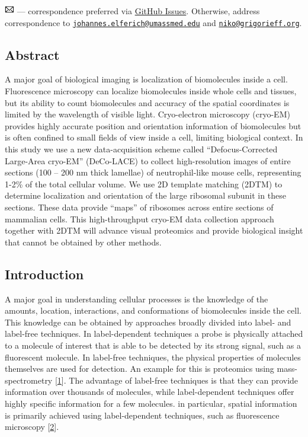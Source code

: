 \documentclass[
]{article}
\begin{document}
\leavevmode{}%
\includegraphics[width=0.16667in,height=0.16667in]{images/envelope.pdf} --- correspondence preferred via \href{https://github.com/jojoelfe/deco_lace_template_matching_manuscript/issues}{GitHub Issues}.
Otherwise, address correspondence to \href{mailto:johannes.elferich@umassmed.edu}{\nolinkurl{johannes.elferich@umassmed.edu}} and \href{mailto:niko@grigorieff.org}{\nolinkurl{niko@grigorieff.org}}.

\hypertarget{abstract}{%
\subsection{Abstract}\label{abstract}}

A major goal of biological imaging is localization of biomolecules inside a cell. Fluorescence microscopy can localize biomolecules inside whole cells
and tissues, but its ability to count biomolecules and accuracy of the spatial
coordinates is limited by the wavelength of visible light. Cryo-electron
microscopy (cryo-EM) provides highly accurate position and orientation
information of biomolecules but is often confined to small fields of view inside
a cell, limiting biological context. In this study we use a new data-acquisition
scheme called ``Defocus-Corrected Large-Area cryo-EM'' (DeCo-LACE) to collect
high-resolution images of entire sections (100 -- 200 nm thick lamellae)
of neutrophil-like mouse cells, representing 1-2\% of the total cellular
volume. We use 2D template matching (2DTM) to determine localization and orientation of the large ribosomal subunit in these sections. These data provide ``maps'' of ribosomes across entire sections of mammalian cells. This high-throughput cryo-EM data collection approach together with 2DTM will advance visual proteomics and provide biological insight that cannot be obtained by other methods.

\hypertarget{introduction}{%
\subsection{Introduction}\label{introduction}}

A major goal in understanding cellular processes is the knowledge of the
amounts, location, interactions, and conformations of biomolecules
inside the cell. This knowledge can be obtained by approaches broadly
divided into label- and label-free techniques. In label-dependent
techniques a probe is physically attached to a molecule of interest that
is able to be detected by its strong signal, such as a
fluorescent molecule. In label-free techniques, the physical properties
of molecules themselves are used for detection. An example for this is
proteomics using mass-spectrometry {[}\protect\hyperlink{ref-tSXIKPl7}{1}{]}. The advantage
of label-free techniques is that they can provide information over
thousands of molecules, while label-dependent techniques offer highly specific
information for a few molecules. in particular, spatial information is primarily achieved using label-dependent techniques, such as
fluorescence microscopy {[}\protect\hyperlink{ref-VBmW7Aot}{2}{]}.
\end{document}
